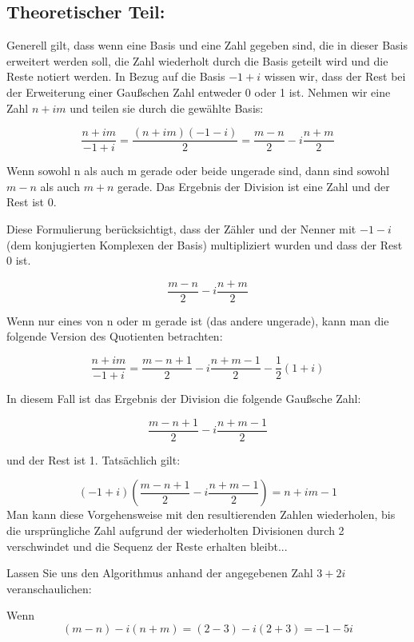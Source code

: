 \documentclass[course=erap]{aspdoc}
\begin{document}
    \subsection{Theoretischer Teil:}
    Generell gilt, dass wenn eine Basis und eine Zahl gegeben sind, die in dieser Basis erweitert werden soll, die Zahl wiederholt durch die Basis geteilt wird und die Reste notiert werden. In Bezug auf die Basis $-1+i$ wissen wir, dass der Rest bei der Erweiterung einer Gaußschen Zahl entweder 0 oder 1 ist.
    \newline
    \newline
    Nehmen wir eine Zahl $n + im$ und teilen sie durch die gewählte Basis:

    \[\frac{{n + im}}{{-1 + i}} = \frac{{(n + im)(-1 - i)}}{2} = \frac{{m - n}}{2} - i\frac{{n + m}}{2}\]

    Wenn sowohl n als auch m gerade oder beide ungerade sind, dann sind sowohl $m-n$ als auch $m+n$ gerade. Das Ergebnis der Division ist eine Zahl und der Rest ist 0.

    Diese Formulierung berücksichtigt, dass der Zähler und der Nenner mit $-1-i$  (dem konjugierten Komplexen der Basis) multipliziert wurden und dass der Rest 0 ist.

    \[\frac{{m - n}}{{2}} - i\frac{{n + m}}{2}\]

    Wenn nur eines von n oder m gerade ist (das andere ungerade), kann man die folgende Version des Quotienten betrachten:

    \[\frac{{n + im}}{{-1 + i}} = \frac{{m - n + 1}}{2} - i \frac{{n + m -1}}{2} - \frac{{1}}{2}(1 + i)\]

    In diesem Fall ist das Ergebnis der Division die folgende Gaußsche Zahl:

    \[\frac{{m - n + 1}}{{2}} - i\frac{{n + m - 1}}{2}\]

    und der Rest ist 1. Tatsächlich gilt:

    \[(-1 +i) (\frac{m - n + 1}{2} - i \frac{n + m - 1}{2}) = n +im - 1\]
    Man kann diese Vorgehensweise mit den resultierenden Zahlen wiederholen, bis die ursprüngliche Zahl aufgrund der wiederholten Divisionen durch 2 verschwindet und die Sequenz der Reste erhalten bleibt...
    \newline

    Lassen Sie uns den Algorithmus anhand der angegebenen Zahl $3 + 2i$ veranschaulichen:

    Wenn
    \[(m - n) - i(n+m)=(2-3) - i(2 + 3) = -1 - 5i\]
\end{document}
